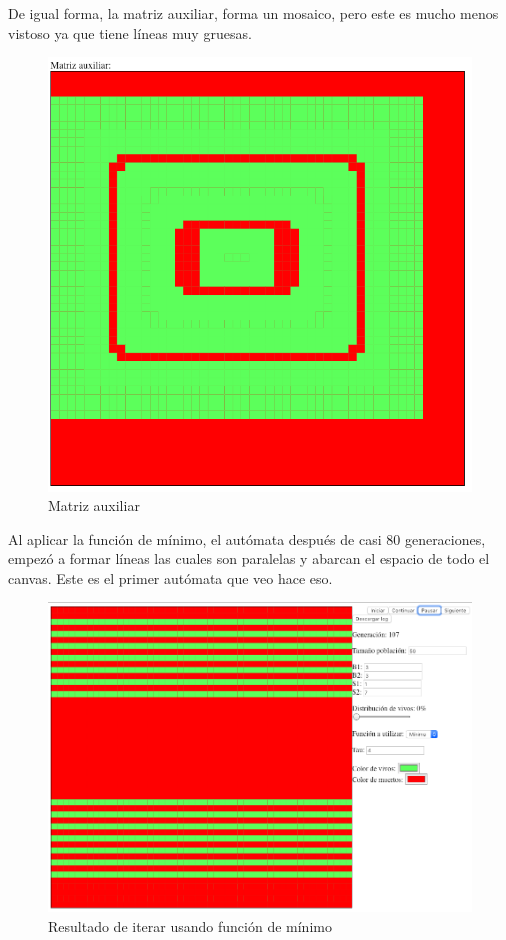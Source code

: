 	De igual forma, la matriz auxiliar, forma un mosaico, pero este es mucho menos vistoso ya que tiene líneas muy gruesas.
	\begin{figure}[H]
		\begin{center}
			\includegraphics[scale=.3]{GOLM/img/regla3317-1-1.png}
			\caption{Matriz auxiliar}
			\label{fig:golm31}
		\end{center}
	\end{figure}


	Al aplicar la función de mínimo, el autómata después de casi 80 generaciones, empezó a formar líneas las cuales son paralelas y abarcan el espacio de todo el canvas. Este es el primer autómata que veo hace eso.
	\begin{figure}[H]
		\begin{center}
			\includegraphics[scale=.3]{GOLM/img/regla3317-2.png}
			\caption{Resultado de iterar usando función de mínimo}
			\label{fig:golm32}
		\end{center}
	\end{figure}


